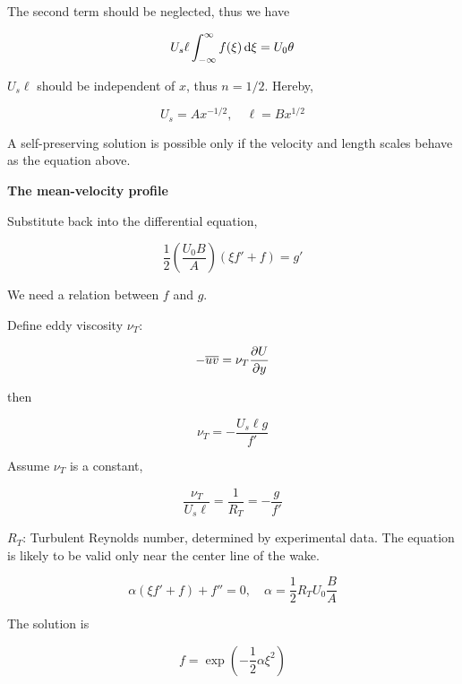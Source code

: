 \documentclass{article}
\begin{document}
The second term should be neglected, thus we have

\begin{equation*}
    U_s\ell\int_{-\infty}^{\infty}f(\xi)\mathop{}\!\mathrm{d}\xi=U_0\theta
\end{equation*}

$U_s\ell$ should be independent of $x$, thus $n=1/2$. Hereby,

\begin{equation*}
    U_s=Ax^{-1/2},\quad\ell=Bx^{1/2}
\end{equation*}

A self-preserving solution is possible only if the velocity and length scales behave as the equation above.

\textbf{The mean-velocity profile}

Substitute back into the differential equation,

\begin{equation*}
    \frac{1}{2}\left(\frac{U_0B}{A}\right)(\xi f'+f)=g'
\end{equation*}

We need a relation between $f$ and $g$.

Define eddy viscosity $\nu_T$:

\begin{equation*}
    -\overline{uv}=\nu_T\frac{\mathop{}\!\partial U}{\mathop{}\!\partial y}
\end{equation*}

then

\begin{equation*}
    \nu_T=-\frac{U_s\ell g}{f'}
\end{equation*}

Assume $\nu_T$ is a constant,

\begin{equation*}
    \frac{\nu_T}{U_s\ell}=\frac{1}{R_T}=-\frac{g}{f'}
\end{equation*}

$R_T$: Turbulent Reynolds number, determined by experimental data. The equation is likely to be valid only near the center line of the wake.

\begin{equation*}
    \alpha(\xi f'+f)+f''=0,\quad \alpha=\frac{1}{2}R_TU_0\frac{B}{A}
\end{equation*}

The solution is

\begin{equation*}
    f=\exp\left(-\frac{1}{2}\alpha\xi^2\right)
\end{equation*}
\end{document}

